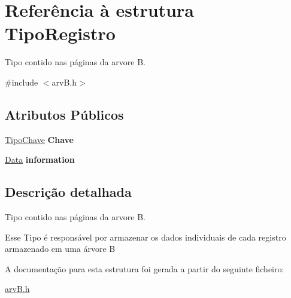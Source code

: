\hypertarget{structTipoRegistro}{}\section{Referência à estrutura Tipo\+Registro}
\label{structTipoRegistro}


Tipo contido nas páginas da arvore B.  




{\ttfamily \#include $<$arv\+B.\+h$>$}

\subsection*{Atributos Públicos}
\begin{DoxyCompactItemize}
\item 
\mbox{\label{structTipoRegistro_acc480529fe4c5435af857da93f2e9ffb}} 
\hyperlink{arvB_8h_ab2b5af9ecc6d9f6d606e199e354c6251}{Tipo\+Chave} {\bfseries Chave}
\item 
\mbox{\label{structTipoRegistro_ab7e4a91243493481db5357e69b3c1bfe}} 
\hyperlink{structData}{Data} {\bfseries information}
\end{DoxyCompactItemize}


\subsection{Descrição detalhada}
Tipo contido nas páginas da arvore B. 

Esse Tipo é responsável por armazenar os dados individuais de cada registro armazenado em uma árvore B 

A documentação para esta estrutura foi gerada a partir do seguinte ficheiro\+:\begin{DoxyCompactItemize}
\item 
\hyperlink{arvB_8h}{arv\+B.\+h}\end{DoxyCompactItemize}
